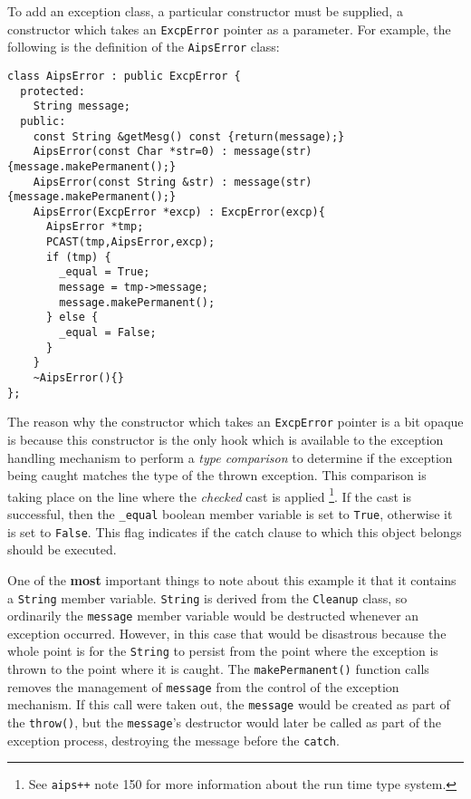 To add an exception class, a particular constructor must be supplied, a
constructor which takes an {\tt ExcpError} pointer as a parameter. For 
example, the following is the definition of the {\tt AipsError} class:
\begin{verbatim}
class AipsError : public ExcpError {
  protected:
    String message;
  public:
    const String &getMesg() const {return(message);}
    AipsError(const Char *str=0) : message(str) {message.makePermanent();}
    AipsError(const String &str) : message(str) {message.makePermanent();}
    AipsError(ExcpError *excp) : ExcpError(excp){
      AipsError *tmp;
      PCAST(tmp,AipsError,excp);
      if (tmp) {
        _equal = True;
        message = tmp->message;
        message.makePermanent();
      } else {
        _equal = False;
      }
    }
    ~AipsError(){}
};
\end{verbatim}
\noindent
The reason why the constructor which takes an {\tt ExcpError} pointer is
a bit opaque is because this constructor is the only hook which is available
to the exception handling mechanism to perform a {\em type comparison} to 
determine if the exception being caught matches the type of the thrown
exception. This comparison is taking place on the line where the 
{\em checked} cast is applied \footnote{See {\tt aips++} note 150 for more 
information about the run time type system.}. If the cast is successful, 
then the {\tt \_equal} boolean member variable is set to {\tt True}, 
otherwise it is set to {\tt False}. This flag indicates if the catch 
clause to which this object belongs should be executed.

One of the {\bf most} important things to note about this example it that 
it contains a {\tt String} member variable. {\tt String} is derived from the 
{\tt Cleanup} class, so ordinarily the {\tt message} member variable
would be destructed whenever an exception occurred. However, in this case 
that would be disastrous because the whole point is for the {\tt String} 
to persist from the point where the exception is thrown to the point where 
it is caught. The {\tt makePermanent()} function calls removes the management
of {\tt message} from the control of the exception mechanism. If this
call were taken out, the {\tt message} would be created as part of the
{\tt throw()}, but the {\tt message}'s destructor would later be called as 
part of the exception process, destroying the message before the {\tt catch}.

